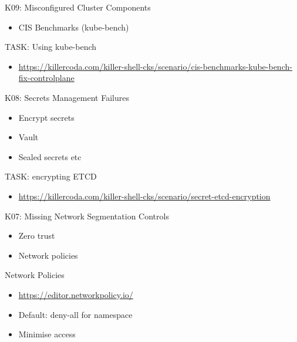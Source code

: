 \documentclass{dcpresentation}
\begin{document}
\begin{frame}{K09: Misconfigured Cluster Components}
  \begin{itemize}
  \item CIS Benchmarks (kube-bench)
  \end{itemize}
\end{frame}

\begin{frame}{TASK: Using kube-bench}
 \begin{itemize}
  \item \url{https://killercoda.com/killer-shell-cks/scenario/cis-benchmarks-kube-bench-fix-controlplane}
 \end{itemize}
\end{frame}


\begin{frame}{K08: Secrets Management Failures}
  \begin{itemize}
  \item Encrypt secrets
  \item Vault
  \item Sealed secrets etc
  \end{itemize}
\end{frame}

\begin{frame}{TASK: encrypting ETCD}
 \begin{itemize}
  \item \url{https://killercoda.com/killer-shell-cks/scenario/secret-etcd-encryption}
 \end{itemize}
\end{frame}

\begin{frame}{K07: Missing Network Segmentation Controls}
  \begin{itemize}
  \item Zero trust 
  \item Network policies
  \end{itemize}
\end{frame}

\begin{frame}{Network Policies}
  \begin{itemize}
  \item \url{https://editor.networkpolicy.io/}
  \item Default: deny-all for namespace
  \item Minimise access
  \end{itemize}
\end{frame}
 
\end{document}
